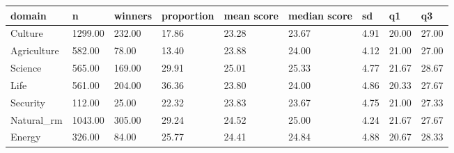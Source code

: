 \begin{table}
\centering
\begin{tabular}[t]{lllllllll}
\toprule
domain & n & winners & proportion & mean score & median score & sd & q1 & q3\\
\midrule
Culture & 1299.00 & 232.00 & 17.86 & 23.28 & 23.67 & 4.91 & 20.00 & 27.00\\
Agriculture & 582.00 & 78.00 & 13.40 & 23.88 & 24.00 & 4.12 & 21.00 & 27.00\\
Science & 565.00 & 169.00 & 29.91 & 25.01 & 25.33 & 4.77 & 21.67 & 28.67\\
Life & 561.00 & 204.00 & 36.36 & 23.80 & 24.00 & 4.86 & 20.33 & 27.67\\
Security & 112.00 & 25.00 & 22.32 & 23.83 & 23.67 & 4.75 & 21.00 & 27.33\\
Natural_rm & 1043.00 & 305.00 & 29.24 & 24.52 & 25.00 & 4.24 & 21.67 & 27.67\\
Energy & 326.00 & 84.00 & 25.77 & 24.41 & 24.84 & 4.88 & 20.67 & 28.33\\
\bottomrule
\end{tabular}
\end{table}
